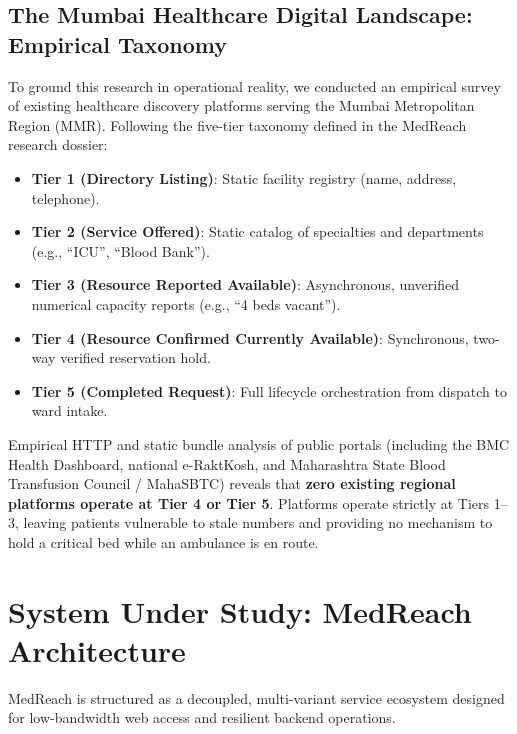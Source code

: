 \documentclass[conference]{IEEEtran}
\begin{document}
\subsection{The Mumbai Healthcare Digital Landscape: Empirical Taxonomy}
To ground this research in operational reality, we conducted an empirical survey of existing healthcare discovery platforms serving the Mumbai Metropolitan Region (MMR). Following the five-tier taxonomy defined in the MedReach research dossier:
\begin{itemize}
    \item \textbf{Tier 1 (Directory Listing)}: Static facility registry (name, address, telephone).
    \item \textbf{Tier 2 (Service Offered)}: Static catalog of specialties and departments (e.g., ``ICU'', ``Blood Bank'').
    \item \textbf{Tier 3 (Resource Reported Available)}: Asynchronous, unverified numerical capacity reports (e.g., ``4 beds vacant'').
    \item \textbf{Tier 4 (Resource Confirmed Currently Available)}: Synchronous, two-way verified reservation hold.
    \item \textbf{Tier 5 (Completed Request)}: Full lifecycle orchestration from dispatch to ward intake.
\end{itemize}

Empirical HTTP and static bundle analysis of public portals (including the BMC Health Dashboard, national e-RaktKosh, and Maharashtra State Blood Transfusion Council / MahaSBTC) reveals that \textbf{zero existing regional platforms operate at Tier 4 or Tier 5}. Platforms operate strictly at Tiers 1--3, leaving patients vulnerable to stale numbers and providing no mechanism to hold a critical bed while an ambulance is en route.

\section{System Under Study: MedReach Architecture}

MedReach is structured as a decoupled, multi-variant service ecosystem designed for low-bandwidth web access and resilient backend operations.
\end{document}
